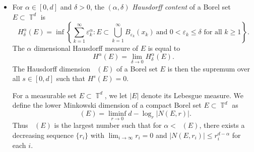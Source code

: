 \documentclass[dvipsnames,letterpaper,12pt]{article}
\numberwithin{equation}{section}
\DeclareMathOperator{\hausdim}{\dim_{\mathbb{H}}}
\DeclareMathOperator{\lowminkdim}{\underline{\dim}_{\mathbb{M}}}
\DeclareMathOperator{\TT}{\mathbb{T}}
\numberwithin{theorem}{section}
\begin{document}
\begin{itemize}
    \item For $\alpha \in [0,d]$ and $\delta > 0$, the $(\alpha,\delta)$ \emph{Hausdorff content} of a Borel set $E \subset \TT^d$ is
    \[ H^\alpha_\delta(E) = \inf \left\{ \sum_{k = 1}^\infty \varepsilon_k^\alpha : E \subset \bigcup_{k = 1}^\infty B_{\varepsilon_k}(x_k)\ \text{and $0 < \varepsilon_k \leq \delta$ for all $k \geq 1$} \right\}. \]
    The $\alpha$ dimensional Hausdorff measure of $E$ is equal to
    \[ H^\alpha(E) = \lim_{\delta \to 0} H^\alpha_\delta(E). \]
    The Hausdorff dimension $\hausdim(E)$ of a Borel set $E$ is then the supremum over all $s \in [0,d]$ such that $H^s(E) = 0$.



    For a measurable set $E \subset \TT^d$, we let $|E|$ denote its Lebesgue measure. We define the lower Minkowski dimension of a compact Borel set $E \subset \TT^d$ as
    \[ \lowminkdim(E) = \liminf_{r \to 0} d - \log_r|N(E,r)|. \]
    Thus $\lowminkdim(E)$ is the largest number such that for $\alpha < \lowminkdim(E)$, there exists a decreasing sequence $\{ r_i \}$ with $\lim_{i \to \infty} r_i = 0$ and $|N(E,r_i)| \leq r_i^{d - \alpha}$ for each $i$.


\end{itemize}
\end{document}
